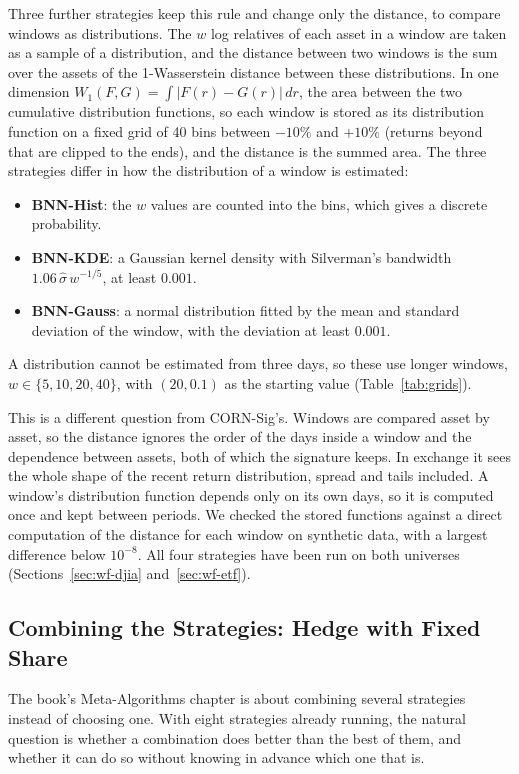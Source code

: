 \documentclass[11pt]{article}
\begin{document}
Three further strategies keep this rule and change only the distance, to
compare windows as distributions. The $w$ log relatives of each asset in a
window are taken as a sample of a distribution, and the distance between
two windows is the sum over the assets of the 1-Wasserstein distance
between these distributions. In one dimension $W_1(F,G) = \int |F(r) -
G(r)|\,dr$, the area between the two cumulative distribution functions, so
each window is stored as its distribution function on a fixed grid of 40
bins between $-10\%$ and $+10\%$ (returns beyond that are clipped to the
ends), and the distance is the summed area. The three strategies differ in
how the distribution of a window is estimated:
\begin{itemize}
    \item \textbf{BNN-Hist}: the $w$ values are counted into the bins, which
    gives a discrete probability.
    \item \textbf{BNN-KDE}: a Gaussian kernel density with Silverman's
    bandwidth $1.06\,\hat\sigma\,w^{-1/5}$, at least $0.001$.
    \item \textbf{BNN-Gauss}: a normal distribution fitted by the mean and
    standard deviation of the window, with the deviation at least $0.001$.
\end{itemize}
A distribution cannot be estimated from three days, so these use longer
windows, $w \in \{5, 10, 20, 40\}$, with $(20, 0.1)$ as the starting value
(Table~\ref{tab:grids}).

This is a different question from CORN-Sig's. Windows are compared asset by
asset, so the distance ignores the order of the days inside a window and the
dependence between assets, both of which the signature keeps. In exchange
it sees the whole shape of the recent return distribution, spread and
tails included. A window's distribution function depends only on its own
days, so it is computed once and kept between periods. We checked the stored
functions against a direct computation of the distance for each window on
synthetic data, with a largest difference below $10^{-8}$. All four
strategies have been run on both universes
(Sections~\ref{sec:wf-djia} and~\ref{sec:wf-etf}).

\subsection{Combining the Strategies: Hedge with Fixed Share}
\label{sec:fixed-share}

The book's Meta-Algorithms chapter is about combining several strategies
instead of choosing one. With eight strategies already running, the natural
question is whether a combination does better than the best of them, and
whether it can do so without knowing in advance which one that is.
\end{document}

